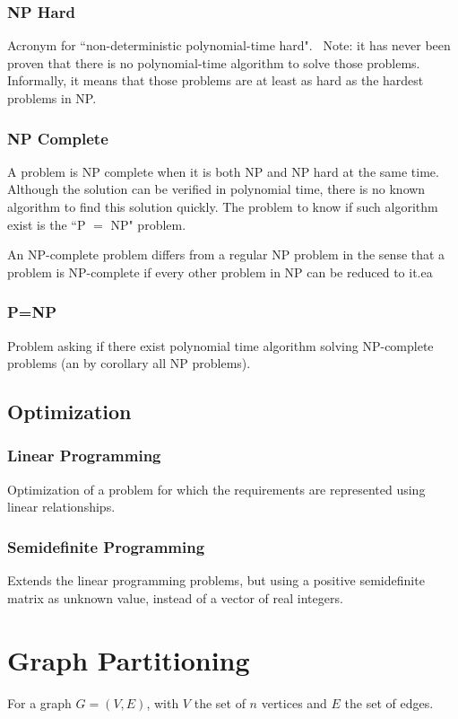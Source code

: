 \documentclass[12pt,a4paper]{article}
\begin{document}
\subsubsection{NP Hard}
Acronym for ``non-deterministic polynomial-time hard".
~\newline{}\noindent Note: it has never been proven that there is no polynomial-time algorithm to solve those problems.
Informally, it means that those problems are at least as hard as the hardest problems in NP.

\subsubsection{NP Complete}
A problem is NP complete when it is both NP and NP hard at the same time.
Although the solution can be verified in polynomial time, there is no known algorithm to find this solution quickly.
The problem to know if such algorithm exist is the ``P $=$ NP" problem.

An NP-complete problem differs from a regular NP problem in the sense that a problem is NP-complete if every other problem in NP can be reduced to it.ea

\subsubsection{P=NP}
Problem asking if there exist polynomial time algorithm solving NP-complete problems (an by corollary all NP problems).

\subsection{Optimization}

\subsubsection{Linear Programming}
Optimization of a problem for which the requirements are represented using linear relationships.

\subsubsection{Semidefinite Programming}
Extends the linear programming problems, but using a positive semidefinite matrix as unknown value, instead of a vector of real integers.

\section{Graph Partitioning}
For a graph $G = (V, E)$, with $V$ the set of $n$ vertices and $E$ the set of edges.
\end{document}
